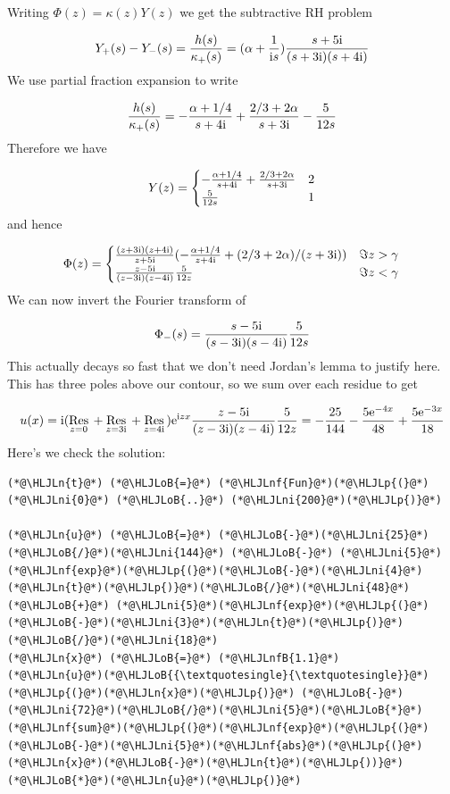 \documentclass[12pt,a4paper]{article}
\newcommand{\HLJLn}[1]{#1}
\newcommand{\HLJLnf}[1]{\textcolor[RGB]{66,102,213}{#1}}
\newcommand{\HLJLnfB}[1]{\textcolor[RGB]{59,151,46}{#1}}
\newcommand{\HLJLni}[1]{\textcolor[RGB]{59,151,46}{#1}}
\newcommand{\HLJLoB}[1]{\textcolor[RGB]{102,102,102}{\textbf{#1}}}
\newcommand{\HLJLp}[1]{#1}
\def\I{ {\rm i} }
\def\E{ {\rm e} }
\def\Res_#1{\underset{#1}{\rm Res}\,}
\begin{document}
Writing $\Phi(z) = \kappa(z) Y(z)$ we get the subtractive RH problem

\[
Y_+(s) - Y_-(s) = {h(s) \over \kappa_+(s)} =  (\alpha + {1 \over \I s}) {s + 5 \I \over (s + 3 \I)(s + 4 \I)}
\]
We use partial fraction expansion to write

\[
{h(s) \over \kappa_+(s)} = -{\alpha + 1/4 \over s+4 \I} + {2/3 + 2 \alpha \over s+3 \I} - {5 \over 12 s}
\]
Therefore we have

\[
Y(z) = \begin{cases} 
-{\alpha + 1/4 \over s+4 \I} + {2/3 + 2 \alpha \over s+3 \I} & 2 \\
        {5 \over 12 s} &1
\end{cases}
\]
and hence

\[
\Phi(z) =      \begin{cases}
{(z+3\I)(z+4\I) \over z+5\I} (-{\ensuremath{\alpha}+1/4 \over z+4\I} + (2/3 + 2\ensuremath{\alpha})/(z+3\I)) & \Im z > \gamma \\
        {z-5\I \over (z-3\I)(z-4\I)} {5 \over 12z}& \Im z < \gamma
        \end{cases}
\]
We can now invert the Fourier transform of 

\[
\Phi_-(s) =         {s-5\I \over (s-3\I)(s-4\I)} {5 \over 12s}
\]
This actually decays so fast that we don't need Jordan's lemma to justify here. This has three poles above our contour, so we sum over each residue to get

\[
u(x) = \I (\Res_{z = 0} +\Res_{z = 3 \I } +\Res_{z = 4\I} )      \E^{\I z x }   {z-5\I \over (z-3\I)(z-4\I)} {5 \over 12z} =  -{25 \over 144} - {5 \E^{-4 x}  \over 48} + {5 \E^{-3 x} \over 18}
\]
Here's we check the solution:


\begin{lstlisting}
(*@\HLJLn{t}@*) (*@\HLJLoB{=}@*) (*@\HLJLnf{Fun}@*)(*@\HLJLp{(}@*)(*@\HLJLni{0}@*) (*@\HLJLoB{..}@*) (*@\HLJLni{200}@*)(*@\HLJLp{)}@*)

(*@\HLJLn{u}@*) (*@\HLJLoB{=}@*) (*@\HLJLoB{-}@*)(*@\HLJLni{25}@*)(*@\HLJLoB{/}@*)(*@\HLJLni{144}@*) (*@\HLJLoB{-}@*) (*@\HLJLni{5}@*)(*@\HLJLnf{exp}@*)(*@\HLJLp{(}@*)(*@\HLJLoB{-}@*)(*@\HLJLni{4}@*)(*@\HLJLn{t}@*)(*@\HLJLp{)}@*)(*@\HLJLoB{/}@*)(*@\HLJLni{48}@*) (*@\HLJLoB{+}@*) (*@\HLJLni{5}@*)(*@\HLJLnf{exp}@*)(*@\HLJLp{(}@*)(*@\HLJLoB{-}@*)(*@\HLJLni{3}@*)(*@\HLJLn{t}@*)(*@\HLJLp{)}@*)(*@\HLJLoB{/}@*)(*@\HLJLni{18}@*)
(*@\HLJLn{x}@*) (*@\HLJLoB{=}@*) (*@\HLJLnfB{1.1}@*)
(*@\HLJLn{u}@*)(*@\HLJLoB{{\textquotesingle}{\textquotesingle}}@*)(*@\HLJLp{(}@*)(*@\HLJLn{x}@*)(*@\HLJLp{)}@*) (*@\HLJLoB{-}@*) (*@\HLJLni{72}@*)(*@\HLJLoB{/}@*)(*@\HLJLni{5}@*)(*@\HLJLoB{*}@*)(*@\HLJLnf{sum}@*)(*@\HLJLp{(}@*)(*@\HLJLnf{exp}@*)(*@\HLJLp{(}@*)(*@\HLJLoB{-}@*)(*@\HLJLni{5}@*)(*@\HLJLnf{abs}@*)(*@\HLJLp{(}@*)(*@\HLJLn{x}@*)(*@\HLJLoB{-}@*)(*@\HLJLn{t}@*)(*@\HLJLp{))}@*)(*@\HLJLoB{*}@*)(*@\HLJLn{u}@*)(*@\HLJLp{)}@*)
\end{lstlisting}
\end{document}
